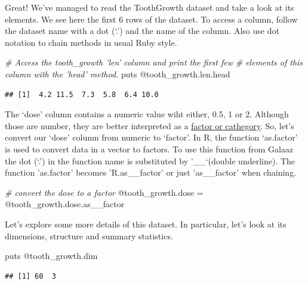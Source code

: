 \documentclass[11pt,]{article}
\newenvironment{Shaded}{\begin{snugshade}}{\end{snugshade}}
\newcommand{\CommentTok}[1]{\textcolor[rgb]{0.56,0.35,0.01}{\textit{#1}}}
\newcommand{\OtherTok}[1]{\textcolor[rgb]{0.56,0.35,0.01}{#1}}
\newcommand{\NormalTok}[1]{#1}
\begin{document}
Great! We've managed to read the ToothGrowth dataset and take a look at
its elements. We see here the first 6 rows of the dataset. To access a
column, follow the dataset name with a dot (`.') and the name of the
column. Also use dot notation to chain methods in usual Ruby style.

\begin{Shaded}
\begin{Highlighting}[]
\CommentTok{# Access the tooth_growth 'len' column and print the first few}
\CommentTok{# elements of this column with the 'head' method.}
\NormalTok{puts }\OtherTok{@tooth_growth}\NormalTok{.len.head}
\end{Highlighting}
\end{Shaded}

\begin{verbatim}
## [1]  4.2 11.5  7.3  5.8  6.4 10.0
\end{verbatim}

The `dose' column contains a numeric value wiht either, 0.5, 1 or 2.
Although those are number, they are better interpreted as a
\href{https://swcarpentry.github.io/r-novice-inflammation/12-supp-factors/}{factor
or cathegory}. So, let's convert our `dose' column from numeric to
`factor'. In R, the function `as.factor' is used to convert data in a
vector to factors. To use this function from Galaaz the dot (`.') in the
function name is substituted by '\_\_`(double underline). The function
'as.factor' becomes 'R.as\_\_factor' or just 'as\_\_factor' when
chaining.

\begin{Shaded}
\begin{Highlighting}[]
\CommentTok{# convert the dose to a factor}
\OtherTok{@tooth_growth}\NormalTok{.dose = }\OtherTok{@tooth_growth}\NormalTok{.dose.as__factor}
\end{Highlighting}
\end{Shaded}

Let's explore some more details of this dataset. In particular, let's
look at its dimensions, structure and summary statistics.

\begin{Shaded}
\begin{Highlighting}[]
\NormalTok{puts }\OtherTok{@tooth_growth}\NormalTok{.dim}
\end{Highlighting}
\end{Shaded}

\begin{verbatim}
## [1] 60  3
\end{verbatim}
\end{document}
